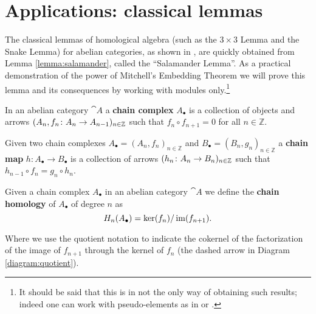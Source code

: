 \newpage
\section{Applications: classical lemmas}
\label{sec:salamanders}
The classical lemmas of homological algebra (such as the \(3\times 3\) Lemma and the Snake Lemma) for abelian categories, as shown in \cite{salaman}, are quickly obtained from Lemma \ref{lemma:salamander}, called the ``Salamander Lemma''. As a practical demonstration of the power of Mitchell's Embedding Theorem we will prove this lemma and its consequences by working with modules only.\footnote{It should be said that this is in not the only way of obtaining such results; indeed one can work with pseudo-elements as in \cite[\S 1.9, \S 1.10]{handbook2} or \cite[\S VIII.4]{catwork}.}

\begin{definition}
  \label{def:chain_complex}
  In an abelian category \(\cat{A}\) a {\bf chain complex} \(A_\bullet\) is a collection of objects and arrows \((A_n, f_n\colon A_n\to A_{n-1})_{n\in\mathbb{Z}}\) such that \(f_n\circ f_{n+1} = 0\) for all \(n\in\mathbb{Z}\).
  \begin{center}
  \end{center}
\end{definition}

\begin{definition}
  \label{def:chain_map}
  Given two chain complexes \(A_\bullet = (A_n, f_n)_{n\in\mathbb{Z}}\) and \(B_\bullet = (B_n, g_n)_{n\in\mathbb{Z}}\) a {\bf chain map} \(h\colon A_\bullet\to B_\bullet\) is a collection of arrows \((h_n\colon A_n\to B_n)_{n\in\mathbb{Z}}\) such that \(h_{n-1}\circ f_n = g_n\circ h_n\).
  \begin{center}
  \end{center}
\end{definition}

\begin{definition}
  \label{def:homology}
  Given a chain complex \(A_\bullet\) in an abelian category \(\cat{A}\) we define the {\bf chain homology} of \(A_\bullet\) of degree \(n\) as
  \begin{equation*}
    H_n(A_\bullet) = \ker(f_{n})/\operatorname{im}(f_{n+1}).
  \end{equation*}

  Where we use the quotient notation to indicate the cokernel of the factorization of the image of \(f_{n+1}\) through the kernel of \(f_{n}\) (the dashed arrow in Diagram \ref{diagram:quotient}).

\end{definition}

